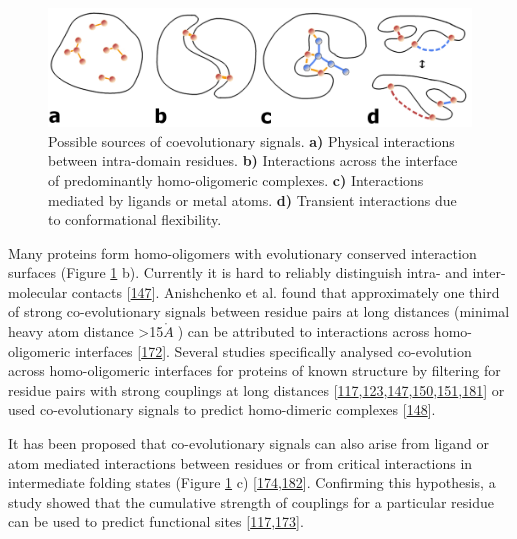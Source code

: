\documentclass[11pt,a4paper,twoside]{book}
\newcommand{\angstrom}{\mathring{A} \;}
\theoremstyle{definition}
\theoremstyle{definition}
\theoremstyle{remark}
\begin{document}
\begin{figure}

{\centering \includegraphics[width=0.9\linewidth]{img/intro/sources_of_coevolution} 

}

\caption{Possible sources of coevolutionary
signals. \textbf{a)} Physical interactions between intra-domain
residues. \textbf{b)} Interactions across the interface of predominantly
homo-oligomeric complexes. \textbf{c)} Interactions mediated by ligands
or metal atoms. \textbf{d)} Transient interactions due to conformational
flexibility.}\label{fig:sources-coevolution}
\end{figure}

Many proteins form homo-oligomers with evolutionary conserved
interaction surfaces (Figure \ref{fig:sources-coevolution} b). Currently
it is hard to reliably distinguish intra- and inter-molecular contacts
{[}\protect\hyperlink{ref-Uguzzoni2017}{147}{]}. Anishchenko et al.
found that approximately one third of strong co-evolutionary signals
between residue pairs at long distances (minimal heavy atom distance
\textgreater{}15\(\angstrom\)) can be attributed to interactions across
homo-oligomeric interfaces
{[}\protect\hyperlink{ref-Anishchenko2017}{172}{]}. Several studies
specifically analysed co-evolution across homo-oligomeric interfaces for
proteins of known structure by filtering for residue pairs with strong
couplings at long distances
{[}\protect\hyperlink{ref-Hopf2012}{117},\protect\hyperlink{ref-Wang2015}{123},\protect\hyperlink{ref-Uguzzoni2017}{147},\protect\hyperlink{ref-Sutto2015}{150},\protect\hyperlink{ref-Jana2014}{151},\protect\hyperlink{ref-Lee2009}{181}{]}
or used co-evolutionary signals to predict homo-dimeric complexes
{[}\protect\hyperlink{ref-DosSantos2015a}{148}{]}.

It has been proposed that co-evolutionary signals can also arise from
ligand or atom mediated interactions between residues or from critical
interactions in intermediate folding states (Figure
\ref{fig:sources-coevolution} c)
{[}\protect\hyperlink{ref-Buslje2009}{174},\protect\hyperlink{ref-Ovchinnikov2015b}{182}{]}.
Confirming this hypothesis, a study showed that the cumulative strength
of couplings for a particular residue can be used to predict functional
sites
{[}\protect\hyperlink{ref-Hopf2012}{117},\protect\hyperlink{ref-Marks2012}{173}{]}.
\end{document}
